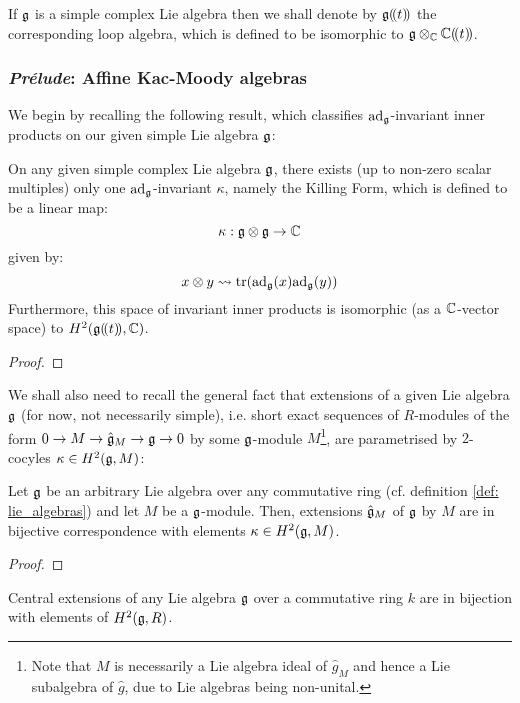             \begin{convention} \label{conv: loop_algebras_1}
                If $\mathfrak{g}$ is a simple complex Lie algebra then we shall denote by $\mathfrak{g}(\!(t)\!)$ the corresponding loop algebra, which is defined to be isomorphic to $\g \tensor_{\bbC} \bbC(\!(t)\!)$.
            \end{convention}
            
            \subsubsection{\textit{Pr\'elude}: Affine Kac-Moody algebras}
                We begin by recalling the following result, which classifies $\mathrm{ad}_{\mathfrak{g}}$-invariant inner products on our given simple Lie algebra $\mathfrak{g}$:
                \begin{lemma} \label{lemma: invariant_inner_products_on_simple_complex_lie_algebras}
                    On any given simple complex Lie algebra $\mathfrak{g}$, there exists (up to non-zero scalar multiples) only one $\mathrm{ad}_{\mathfrak{g}}$-invariant $\kappa$, namely the Killing Form, which is defined to be a linear map:
                        $$\kappa: \g \tensor \g \to \bbC$$
                    given by:
                        $$x \tensor y \mapsto \trace(\ad_{\g}(x) \ad_{\g}(y))$$
                    Furthermore, this space of invariant inner products is isomorphic (as a $\mathbb{C}$-vector space) to $H^2(\mathfrak{g}(\!(t)\!), \mathbb{C})$.
                \end{lemma}
                    \begin{proof}
                        
                    \end{proof}
                We shall also need to recall the general fact that extensions of a given Lie algebra $\mathfrak{g}$ (for now, not necessarily simple), i.e. short exact sequences of $R$-modules of the form $0 \to M \to \hat{\mathfrak{g}}_M \to \mathfrak{g} \to 0$ by some $\mathfrak{g}$-module $M$\footnote{Note that $M$ is necessarily a Lie algebra ideal of $\hat{g}_M$ and hence a Lie subalgebra of $\hat{g}$, due to Lie algebras being non-unital.}, are parametrised by $2$-cocyles $\kappa \in H^2(\mathfrak{g}, M)$:
                \begin{lemma} \label{lemma: lie_algebra_extensions_are_2_cocycles}
                    Let $\mathfrak{g}$ be an arbitrary Lie algebra over any commutative ring (cf. definition \ref{def: lie_algebras}) and let $M$ be a $\mathfrak{g}$-module. Then, extensions $\hat{\mathfrak{g}}_M$ of $\mathfrak{g}$ by $M$ are in bijective correspondence with elements $\kappa \in H^2(\mathfrak{g}, M)$.
                \end{lemma}
                    \begin{proof}
                        
                    \end{proof}
                \begin{corollary}
                    Central extensions of any Lie algebra $\mathfrak{g}$ over a commutative ring $k$ are in bijection with elements of $H^2(\mathfrak{g}, R)$.
                \end{corollary}
                    
